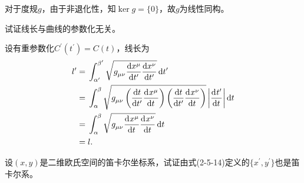 \begin{xiti}
\begin{zm}
        对于度规$g$，由于非退化性，知$\ker g=\{0\}$，故$g$为线性同构。
    \end{zm}

    \item 试证线长与曲线的参数化无关。

    \begin{zm}
    	设有重参数化$C^\prime(t^\prime)=C(t)$，线长为
    	\begin{align*}
    	\allowdisplaybreaks
    	l^\prime=&\;\int_{\alpha^\prime}^{\beta^\prime} \sqrt{\tensor{g}{_\mu_\nu} \dv{x^\mu}{t^\prime}\dv{x^\nu}{t^\prime} }\dd{t^\prime}\\
    	=&\;\int_{\alpha}^{\beta} \sqrt{\tensor{g}{_\mu_\nu} \left(\dv{t}{t^\prime}\dvt{x^\mu} \right)\left( \dv{t}{t^\prime}\dvt{x^\nu} \right) }\left| \dvt{t^\prime} \right|\dd{t}\\
    	=&\;\int_{\alpha}^{\beta} \sqrt{\tensor{g}{_\mu_\nu}\dvt{x^\mu}\dvt{x^\nu} }\dd{t}\\
    	=&\;l.
    	\end{align*}
    \end{zm}

    \item 设$(x,y)$是二维欧氏空间的笛卡尔坐标系，试证由式(2-5-14)定义的$\{x^\prime,y^\prime \}$也是笛卡尔系。


\end{xiti}
